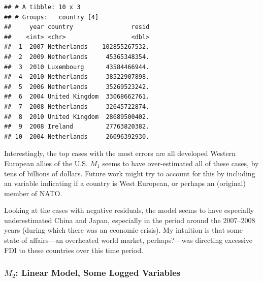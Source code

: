 \documentclass[11pt,]{article}
\newenvironment{Shaded}{\begin{snugshade}}{\end{snugshade}}
\newcommand{\DataTypeTok}[1]{\textcolor[rgb]{0.13,0.29,0.53}{#1}}
\newcommand{\DecValTok}[1]{\textcolor[rgb]{0.00,0.00,0.81}{#1}}
\newcommand{\KeywordTok}[1]{\textcolor[rgb]{0.13,0.29,0.53}{\textbf{#1}}}
\newcommand{\NormalTok}[1]{#1}
\newcommand{\OperatorTok}[1]{\textcolor[rgb]{0.81,0.36,0.00}{\textbf{#1}}}
\newcommand{\StringTok}[1]{\textcolor[rgb]{0.31,0.60,0.02}{#1}}
\begin{document}
\begin{Shaded}
\end{Shaded}

\begin{verbatim}
## # A tibble: 10 x 3
## # Groups:   country [4]
##     year country                resid
##    <int> <chr>                  <dbl>
##  1  2007 Netherlands    102855267532.
##  2  2009 Netherlands     45365348354.
##  3  2010 Luxembourg      43584466944.
##  4  2010 Netherlands     38522907898.
##  5  2006 Netherlands     35269523242.
##  6  2004 United Kingdom  33068662761.
##  7  2008 Netherlands     32645722874.
##  8  2010 United Kingdom  28689500402.
##  9  2008 Ireland         27763820382.
## 10  2004 Netherlands     26096392930.
\end{verbatim}

Interestingly, the top cases with the most errors are all developed
Western European allies of the U.S. \(M_1\) seems to have over-estimated
all of these cases, by tens of billions of dollars. Future work might
try to account for this by including an variable indicating if a country
is West European, or perhaps an (original) member of NATO.

Looking at the cases with negative residuals, the model seems to have
especially underestimated China and Japan, especially in the period
around the 2007--2008 years (during which there was an economic crisis).
My intuition is that some state of affairs---an overheated world market,
perhaps?---was directing excessive FDI to these countries over this time
period.

\hypertarget{m_2-linear-model-some-logged-variables}{%
\subsubsection{\texorpdfstring{\(M_2\): Linear Model, Some Logged
Variables}{M\_2: Linear Model, Some Logged Variables}}\label{m_2-linear-model-some-logged-variables}}
\end{document}
